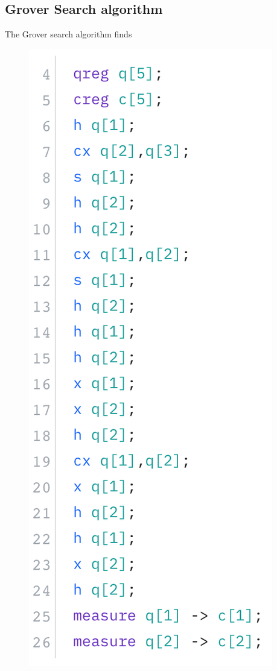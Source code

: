 \documentclass[12pt]{article}
\begin{document}
    \subsection{Grover Search algorithm}
        The Grover search algorithm finds 
        \begin{figure}[ht]
            \centering
            \begin{minipage}{0.35\linewidth}
                \includegraphics[width=\linewidth]{Circuits/grover-code.png}

\end{minipage}
\end{figure}
\end{document}
